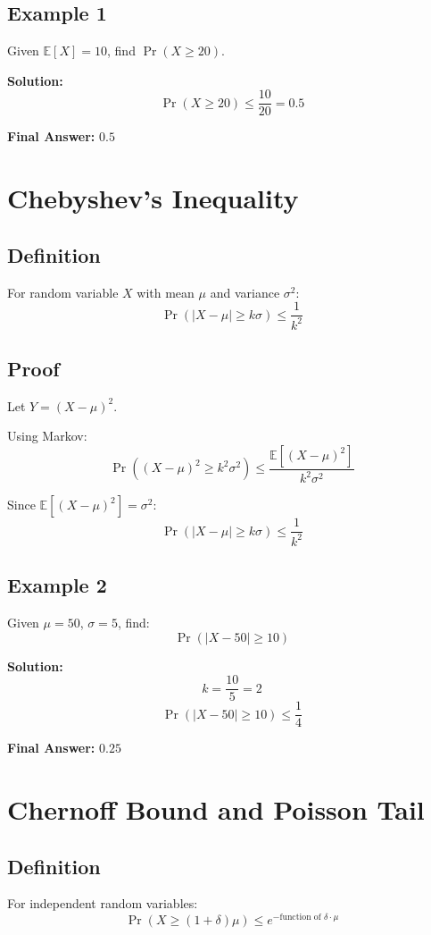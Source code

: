 \documentclass[11pt]{article}
\begin{document}
\subsection*{Example 1}
Given $\mathbb{E}[X] = 10$, find $\Pr(X \geq 20)$.

\textbf{Solution:}
\[
\Pr(X \geq 20) \leq \frac{10}{20} = 0.5
\]

\textbf{Final Answer:} $0.5$

\section{Chebyshev’s Inequality}

\subsection*{Definition}
For random variable $X$ with mean $\mu$ and variance $\sigma^2$:
\[
\Pr(|X - \mu| \geq k\sigma) \leq \frac{1}{k^2}
\]

\subsection*{Proof}
Let $Y = (X - \mu)^2$.

Using Markov:
\[
\Pr((X - \mu)^2 \geq k^2\sigma^2) \leq \frac{\mathbb{E}[(X - \mu)^2]}{k^2\sigma^2}
\]

Since $\mathbb{E}[(X - \mu)^2] = \sigma^2$:
\[
\Pr(|X - \mu| \geq k\sigma) \leq \frac{1}{k^2}
\]

\subsection*{Example 2}
Given $\mu = 50$, $\sigma = 5$, find:
\[
\Pr(|X - 50| \geq 10)
\]

\textbf{Solution:}
\[
k = \frac{10}{5} = 2
\]
\[
\Pr(|X - 50| \geq 10) \leq \frac{1}{4}
\]

\textbf{Final Answer:} $0.25$

\section{Chernoff Bound and Poisson Tail}

\subsection*{Definition}
For independent random variables:
\[
\Pr(X \geq (1+\delta)\mu) \leq e^{-\text{function of } \delta \cdot \mu}
\]
\end{document}
